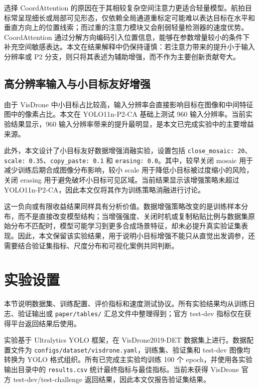 \documentclass[UTF8,a4paper,10.5pt,fontset=windows]{ctexart}
\newcommand{\YOLOPtwoCA}{\mbox{YOLO11n-P2-CA}}
\newcommand{\CoordAtt}{\mbox{CoordAttention}}
\begin{document}
选择 \CoordAtt{} 的原因在于其相较复杂空间注意力更适合轻量模型。航拍目标常呈现细长或局部可见形态，仅依赖全局通道重标定可能难以表达目标在水平和垂直方向上的位置线索；而过重的注意力模块又会削弱轻量检测器的速度优势。\CoordAtt{} 通过分解方向编码引入位置信息，能够在参数增量较小的条件下补充空间敏感表达。本文在结果解释中仍保持谨慎：若注意力带来的提升小于输入分辨率或 P2 分支，则只将其表述为辅助增强，而不作为主要创新贡献夸大。

\subsection{高分辨率输入与小目标友好增强}

由于 VisDrone 中小目标占比较高，输入分辨率会直接影响目标在图像和中间特征图中的像素占比。本文在 \YOLOPtwoCA{} 基础上测试 960 输入分辨率。当前实验结果显示，960 输入分辨率带来的提升最明显，是本文已完成实验中的主要增益来源。

此外，本文设计了小目标友好数据增强消融实验，设置包括 \texttt{close\_mosaic: 20}、\texttt{scale: 0.35}、\texttt{copy\_paste: 0.1} 和 \texttt{erasing: 0.0}。其中，较早关闭 mosaic 用于减少训练后期合成图像分布影响，较小 scale 用于降低小目标被过度缩小的风险，关闭 erasing 用于避免破坏小目标可见区域。当前结果显示该增强策略未超过 \YOLOPtwoCA{}，因此本文仅将其作为训练策略消融进行讨论。

这一负向或有限收益结果同样具有分析价值。数据增强策略改变的是训练样本分布，而不是直接改变模型结构；当增强强度、关闭时机或复制粘贴比例与数据集原始分布不匹配时，模型可能学习到更多合成场景特征，却未必提升真实验证集表现。因此，本文保留该实验结果，用于说明小目标增强不能只从直觉出发调参，还需要结合验证集指标、尺度分布和可视化案例共同判断。

\section{实验设置}

本节说明数据集、训练配置、评价指标和速度测试协议。所有实验结果均从训练日志、验证输出或 \texttt{paper/tables/} 汇总文件中整理得到；官方 test-dev 指标仅在获得平台返回结果后使用。

实验基于 Ultralytics YOLO 框架，在 VisDrone2019-DET 数据集上进行。数据配置文件为 \texttt{configs/dataset/visdrone.yaml}，训练集、验证集和 test-dev 图像均转换为 YOLO 格式组织。所有已完成主实验均训练 100 个 epoch，并使用各实验输出目录中的 \texttt{results.csv} 统计最终指标与最佳指标。当前未获得 VisDrone 官方 test-dev/test-challenge 返回结果，因此本文仅报告验证集结果。
\end{document}
